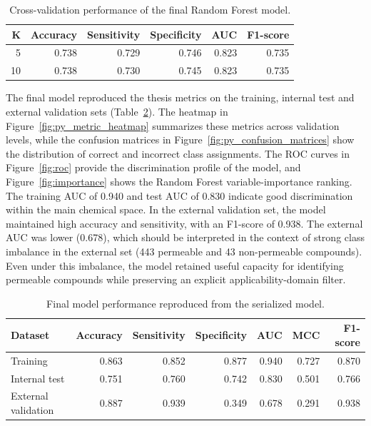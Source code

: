\documentclass[11pt]{article}
\begin{document}
\begin{table}[H]
\centering
\caption{Cross-validation performance of the final Random Forest model.}
\label{tab:cv}
\begin{tabular}{rrrrrr}
\toprule
K & Accuracy & Sensitivity & Specificity & AUC & F1-score \\
\midrule
5 & 0.738 & 0.729 & 0.746 & 0.823 & 0.735 \\
10 & 0.738 & 0.730 & 0.745 & 0.823 & 0.735 \\
\bottomrule
\end{tabular}
\end{table}

The final model reproduced the thesis metrics on the training, internal test and external validation sets (Table~\ref{tab:metrics}). The heatmap in Figure~\ref{fig:py_metric_heatmap} summarizes these metrics across validation levels, while the confusion matrices in Figure~\ref{fig:py_confusion_matrices} show the distribution of correct and incorrect class assignments. The ROC curves in Figure~\ref{fig:roc} provide the discrimination profile of the model, and Figure~\ref{fig:importance} shows the Random Forest variable-importance ranking. The training AUC of 0.940 and test AUC of 0.830 indicate good discrimination within the main chemical space. In the external validation set, the model maintained high accuracy and sensitivity, with an F1-score of 0.938. The external AUC was lower (0.678), which should be interpreted in the context of strong class imbalance in the external set (443 permeable and 43 non-permeable compounds). Even under this imbalance, the model retained useful capacity for identifying permeable compounds while preserving an explicit applicability-domain filter.

\begin{table}[H]
\centering
\caption{Final model performance reproduced from the serialized model.}
\label{tab:metrics}
\begin{tabular}{lrrrrrr}
\toprule
Dataset & Accuracy & Sensitivity & Specificity & AUC & MCC & F1-score \\
\midrule
Training & 0.863 & 0.852 & 0.877 & 0.940 & 0.727 & 0.870 \\
Internal test & 0.751 & 0.760 & 0.742 & 0.830 & 0.501 & 0.766 \\
External validation & 0.887 & 0.939 & 0.349 & 0.678 & 0.291 & 0.938 \\
\bottomrule
\end{tabular}
\end{table}
\end{document}
